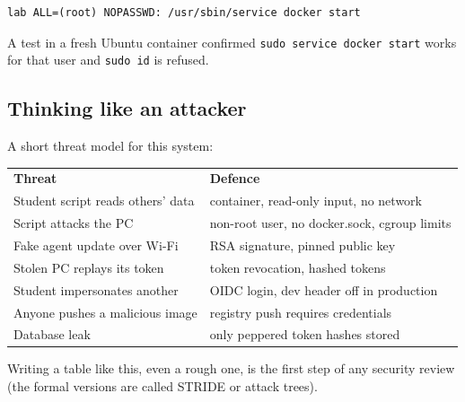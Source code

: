 \begin{verbatim}
lab ALL=(root) NOPASSWD: /usr/sbin/service docker start
\end{verbatim}

A test in a fresh Ubuntu container confirmed \texttt{sudo service docker start}
works for that user and \texttt{sudo id} is refused.

\subsection{Thinking like an attacker}

A short threat model for this system:

\begin{center}
\begin{tabular}{ll}
\textbf{Threat} & \textbf{Defence} \\
Student script reads others' data & container, read-only input, no network \\
Script attacks the PC & non-root user, no docker.sock, cgroup limits \\
Fake agent update over Wi-Fi & RSA signature, pinned public key \\
Stolen PC replays its token & token revocation, hashed tokens \\
Student impersonates another & OIDC login, dev header off in production \\
Anyone pushes a malicious image & registry push requires credentials \\
Database leak & only peppered token hashes stored \\
\end{tabular}
\end{center}

Writing a table like this, even a rough one, is the first step of any security
review (the formal versions are called STRIDE or attack trees).
